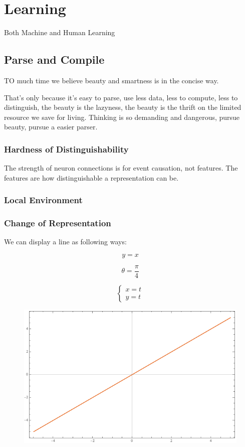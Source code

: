 \chapter{Learning}

Both Machine and Human Learning

\section{Parse and Compile}
TO much time we believe beauty and smartness is in the concise way.

That's only because it's easy to parse, use less data, less to compute, less to distinguish, the beauty is the lazyness, the beauty is the thrift on the limited resource we save for living. Thinking is so demanding and dangerous, pursue beauty, pursue a easier parser.

\subsection{Hardness of Distinguishability}
The strength of neuron connections is for event causation, not features.
The features are how distinguishable a representation can be.
\subsection{Local Environment}
\subsection{Change of Representation}
We can display a line as following ways:

\[ y = x \]

\[ \theta = \dfrac{\pi}{4} \]

\[ \begin{cases}
x = t \\
y = t
\end{cases} \]

\begin{figure}
  \includegraphics[width=\linewidth]{img/y=x.png}
  \label{fig:y=x}
\end{figure}




